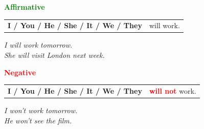 \documentclass[a4paper,10pt]{article}
\newcommand{\sectiontitle}[2]{%
  {\large\bfseries\textcolor{#1}{#2}}%
}
\begin{document}
\begin{minipage}[t]{.485\textwidth}
\begin{greenbox}
  \sectiontitle{Green}{Affirmative}

  \vspace{0.75mm}
  \begin{tabular}{@{}>{\bfseries}l l@{}}
    I / You / He / She / It / We / They & will work.\\
    
  \end{tabular}

  \vspace{0.75mm}
  \textit{I will work tomorrow.}\\[-1mm]
  \textit{She will visit London next week.}
\end{greenbox}
\end{minipage}
\hfill
\begin{minipage}[t]{.485\textwidth}
\begin{redbox}
  \sectiontitle{Red}{Negative}

  \vspace{0.75mm}
  \begin{tabular}{@{}>{\bfseries}l l@{}}
    I / You / He / She / It / We / They & \textcolor{Red}{\bfseries will not} work.\\
    
  \end{tabular}

  \vspace{0.75mm}
  \textit{I won't work tomorrow.}\\[-1mm]
  \textit{He won't see the film.}
\end{redbox}
\end{minipage}

\vspace{1.35mm}
\end{document}
